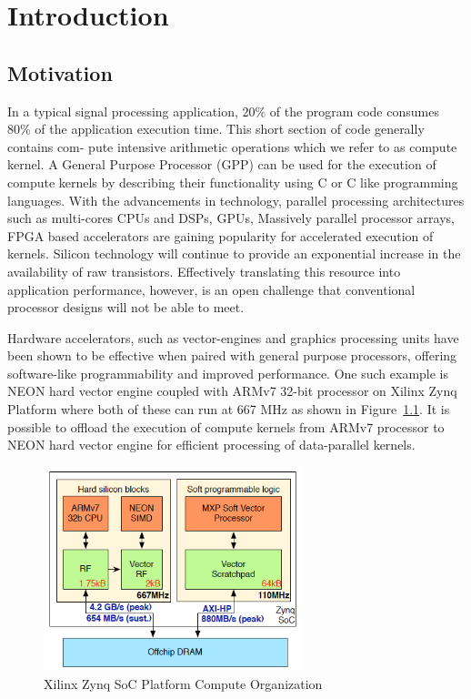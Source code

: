 \chapter{Introduction}
\label{ch1_introduction}
\section{Motivation}
In a typical signal processing application, 20\% of the program code consumes 80\%
of the application execution time. This short section of code generally contains com-
pute intensive arithmetic operations which we refer to as compute kernel.
A General Purpose Processor (GPP) can be used for the execution of compute kernels by describing their functionality using C or C like programming languages. With
the advancements in technology, parallel processing architectures such as multi-cores
CPUs and DSPs, GPUs, Massively parallel processor arrays, FPGA based accelerators are gaining popularity for accelerated execution of kernels. Silicon technology will continue to provide an exponential increase in the availability of raw transistors. Effectively translating this resource into application performance, however, is an open challenge that conventional processor designs will not be able to meet.

Hardware accelerators, such as vector-engines and graphics processing units have been shown to be effective when paired with general purpose processors, offering software-like
programmability and improved performance.
One such example is NEON hard vector engine coupled with ARMv7 32-bit processor on Xilinx Zynq Platform where both of these can run at 667 MHz as shown in Figure~\ref{arm-neon-mxp}. It is possible to offload the execution of compute kernels from ARMv7 processor to NEON hard vector engine for efficient processing of data-parallel kernels.

\begin{figure}
	\centering
	\includegraphics[width=0.67\textwidth]{images/arm-neon-mxp.png}
	\caption{Xilinx Zynq SoC Platform Compute Organization~\cite{kapre2016optimizing}}
	\label{arm-neon-mxp}
\end{figure}


